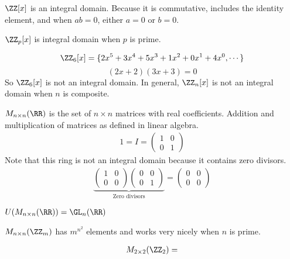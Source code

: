 \documentclass[class=scrartcl, crop=false]{standalone}
\begin{document}
\begin{lemma}
  $\ZZ[x]$ is an integral domain. Because it is commutative, includes the identity element, and when $ab = 0$, either $a = 0$ or $b = 0$.
\end{lemma} 
\begin{lemma}
  $\ZZ_p[x]$ is integral domain when $p$ is prime.
\end{lemma} 
\begin{example}
  \[\ZZ_6[x] = \{2x^5 + 3x^4 + 5x^3 + 1x^2 + 0x^1 + 4x^0, \cdots\}\]
  \[
    (2x + 2)(3x + 3) = 0
  \]
  So $\ZZ_6[x]$ is not an integral domain. In general, $\ZZ_n[x]$ is not an integral domain when $n$ is composite.
\end{example} 
\begin{definition}
  $M_{n \times n}(\RR)$ is the set of $n \times n$ matrices with real coefficients. Addition and multiplication of matrices as defined in linear algebra.
  \begin{gather*}
    1 = I = 
    \begin{pmatrix}
      1 & 0 \\
      0 & 1
    \end{pmatrix} 
  \end{gather*}
  Note that this ring is not an integral domain because it contains zero divisors.
  \begin{gather*}
    \underbrace{
      \begin{pmatrix}
        1 & 0 \\
        0 & 0
      \end{pmatrix} 
      \begin{pmatrix}
        0 & 0 \\
        0 & 1
      \end{pmatrix} 
    }_{\text{Zero divisors}}
    =
    \begin{pmatrix}
      0 & 0 \\
      0 & 0
    \end{pmatrix} 
  \end{gather*} 
  \begin{note}
    $U(M_{n \times n}(\RR)) = \GL_n(\RR)$
  \end{note} 
  \begin{note}
    $M_{n  \times n}(\ZZ_m)$ has $m^{n^{2}}$ elements and works very nicely when $n$ is prime.
  \end{note} 
  \begin{example}
    \begin{gather*}
      M_{2 \times 2}(\ZZ_2) =\\

\end{gather*}
\end{example}
\end{definition}
\end{document}
